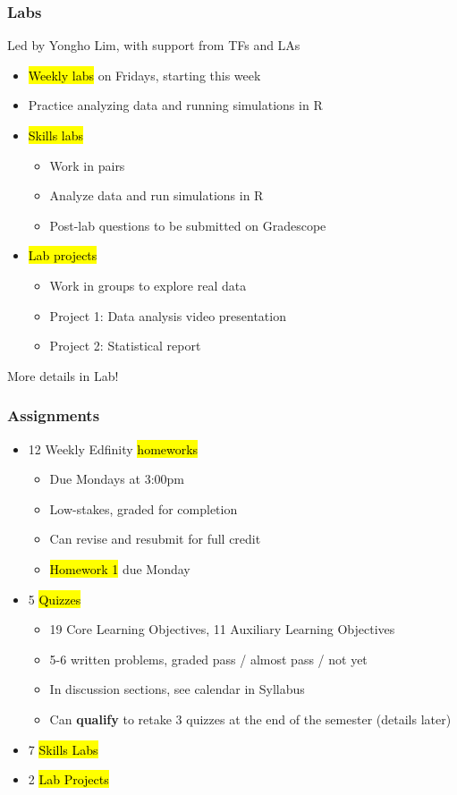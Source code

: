 \documentclass[slidestop,compress,mathserif]{beamer}
\begin{document}
\begin{frame}
	\frametitle{Labs} 
	Led by Yongho Lim, with support from TFs and LAs
	\begin{itemize}
		\item \hl{Weekly labs} on Fridays, starting this week
		\item Practice analyzing data and running simulations in R
		\item \hl{Skills labs}
		\begin{itemize}
			\item Work in pairs
			\item Analyze data and run simulations in R
			\item Post-lab questions to be submitted on Gradescope
		\end{itemize}
		\item \hl{Lab projects}
		\begin{itemize}
			\item Work in groups to explore real data
			\item Project 1: Data analysis video presentation
			\item Project 2: Statistical report
		\end{itemize}
	\end{itemize}
	More details in Lab!
\end{frame}


\begin{frame}
	\frametitle{Assignments}
	\begin{itemize}
		\item 12 Weekly Edfinity \hl{homeworks}
		\begin{itemize}
			\item Due Mondays at 3:00pm
			\item Low-stakes, graded for completion
			\item Can revise and resubmit for full credit
			\item \hl{Homework 1} due Monday
		\end{itemize} 
		\item 5 \hl{Quizzes} 
		\begin{itemize}
			\item 19 Core Learning Objectives, 11 Auxiliary Learning Objectives
			\item 5-6 written problems, graded pass / almost pass / not yet
			\item In discussion sections, see calendar in Syllabus
			\item Can \textbf{qualify} to retake 3 quizzes at the end of the semester (details later)
		\end{itemize}
		\item 7 \hl{Skills Labs}
		\item 2 \hl{Lab Projects}
	\end{itemize}
\end{frame}
\end{document}

